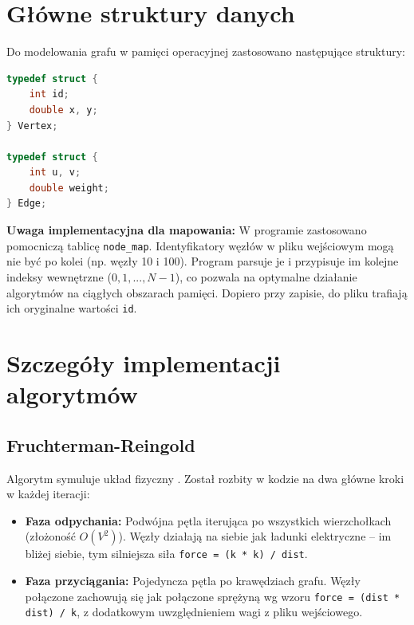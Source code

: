 \documentclass[12pt,a4paper]{article}
\begin{document}
\section{Główne struktury danych}
Do modelowania grafu w pamięci operacyjnej zastosowano następujące struktury:

\begin{lstlisting}[language=C]
typedef struct { 
    int id; 
    double x, y; 
} Vertex;

typedef struct { 
    int u, v; 
    double weight; 
} Edge;
\end{lstlisting}

\textbf{Uwaga implementacyjna dla mapowania:} W programie zastosowano pomocniczą tablicę \texttt{node\_map}. Identyfikatory węzłów w pliku wejściowym mogą nie być po kolei (np. węzły 10 i 100). Program parsuje je i przypisuje im kolejne indeksy wewnętrzne ($0, 1, ..., N-1$), co pozwala na optymalne działanie algorytmów na ciągłych obszarach pamięci. Dopiero przy zapisie, do pliku trafiają ich oryginalne wartości \texttt{id}.

\section{Szczegóły implementacji algorytmów}

\subsection{Fruchterman-Reingold}
Algorytm symuluje układ fizyczny . Został rozbity w kodzie na dwa główne kroki w każdej iteracji:
\begin{itemize}
    \item \textbf{Faza odpychania:} Podwójna pętla iterująca po wszystkich wierzchołkach (złożoność $O(V^2)$). Węzły działają na siebie jak ładunki elektryczne -- im bliżej siebie, tym silniejsza siła \texttt{force = (k * k) / dist}.
    \item \textbf{Faza przyciągania:} Pojedyncza pętla po krawędziach grafu. Węzły połączone zachowują się jak połączone sprężyną wg wzoru \texttt{force = (dist * dist) / k}, z dodatkowym uwzględnieniem wagi z pliku wejściowego.
\end{itemize}
\end{document}
